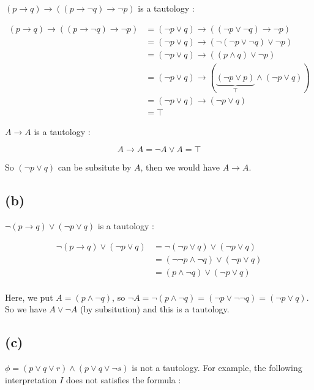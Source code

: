 \documentclass[a4paper,11pt]{report}
\begin{document}
$(p \rightarrow q) \rightarrow ((p \rightarrow \neg q) \rightarrow \neg p)$ is a
tautology :

\begin{align*}
  (p \rightarrow q) \rightarrow ((p \rightarrow \neg q) \rightarrow \neg p)
  &= (\neg p \vee q) \rightarrow ((\neg p \vee \neg q) \rightarrow \neg p) \\
  &= (\neg p \vee q) \rightarrow (\neg (\neg p \vee \neg q) \vee \neg p) \\
  &= (\neg p \vee q) \rightarrow ((p \wedge q) \vee \neg p) \\
  &= (\neg p \vee q) \rightarrow (\underbrace{(\neg p \vee p)}_{\top} \wedge (\neg p \vee q)) \\
  &= (\neg p \vee q) \rightarrow (\neg p \vee q) \\
  &= \top
\end{align*}

$A \rightarrow A$ is a tautology :

\[
  A \rightarrow A = \neg A \vee A = \top
\]

So $(\neg p \vee q)$ can be subsitute by $A$, then we would have $A \rightarrow A$. 

\subsection*{(b)}

$\neg(p \rightarrow q) \vee (\neg p \vee q)$ is a tautology :

\begin{align*}
  \neg(p \rightarrow q) \vee (\neg p \vee q)
  &= \neg(\neg p \vee q) \vee (\neg p \vee q)\\
  &= (\neg \neg p \wedge \neg q) \vee (\neg p \vee q)\\
  &= (p \wedge \neg q) \vee (\neg p \vee q)\\
\end{align*}

Here, we put $A = (p \wedge \neg q)$, so $\neg A = \neg(p \wedge \neg q) = (\neg
p \vee \neg \neg q) = (\neg p \vee q)$. So we have $A \vee \neg A$ (by
subsitution) and this is a tautology.

\subsection*{(c)}

$\phi = (p \vee q \vee r) \wedge (p \vee q \vee \neg s)$ is not a tautology. For
example, the following interpretation $I$ does not satisfies the formula :
\end{document}
